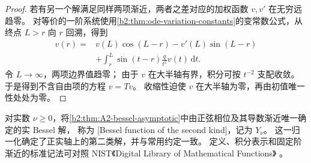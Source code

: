 \begin{proof}
若有另一个解满足同样两项渐近，两者之差对应的加权函数 \(v,v'\) 在无穷远趋零。
对等价的一阶系统使用\cref{b2:thm:ode-variation-constants}的变常数公式，从终点 \(L>r\) 向 \(r\) 回溯，得到
\[
 \begin{aligned}
 v(r)={}&v(L)\cos(L-r)-v'(L)\sin(L-r)\\
 &+\int_r^L\sin(t-r)\frac q{t^2}v(t)\,\mathrm dt.
 \end{aligned}
\]
令 \(L\to\infty\)，两项边界值趋零；
由于 \(v\) 在大半轴有界，积分可按 \(t^{-2}\) 支配收敛。
于是得到不含自由项的方程 \(v=Tv\)。
收缩性迫使 \(v\) 在大半轴为零，再由初值唯一性处处为零。
\end{proof}

对实数 \(\nu\geq0\)，将\cref{b2:thm:A2-bessel-asymptotic}中由正弦相位及其导数渐近唯一确定的实 Bessel 解，
称为 [Bessel function of the second kind]，记为 \(Y_\nu\)。
这一归一化确定了正实轴上的第二类解，并与常用约定一致。
定义、积分表示和固定阶渐近的标准记法可对照 NIST《Digital Library of Mathematical Functions》
\cite[\S\S10.2, 10.9, 10.17]{NationalInstituteofStandardsNIST}。

